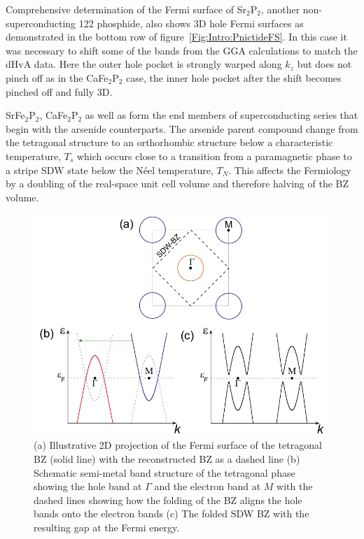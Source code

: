 Comprehensive determination of the Fermi surface of Sr$_2$P$_2$, another non-superconducting 122 phosphide, also shows 3D hole Fermi surfaces as demonstrated in the bottom row of figure~\ref{Fig:Intro:PnictideFS}. In this case it was necessary to shift some of the bands from the \ac{GGA} calculations to match the \ac{dHvA} data. Here the outer hole pocket is strongly warped along $k_z$ but does not pinch off as in the CaFe$_2$P$_2$ case, the inner hole pocket after the shift becomes pinched off and fully 3D.

SrFe$_2$P$_2$, CaFe$_2$P$_2$ as well as \BaFeP form the end members of superconducting series that begin with the arsenide counterparts. The arsenide parent compound change from the tetragonal structure to an orthorhombic structure below a characteristic temperature, $T_s$ which occurs close to a transition from a paramagnetic phase to a stripe \ac{SDW} state below the N\'eel temperature, $T_N$. This affects the Fermiology by a doubling of the real-space unit cell volume and therefore halving of the \ac{BZ} volume.
\begin{figure}[htbp]
    \begin{center}
        \includegraphics[scale=0.7]{Chapter-Introduction/Figures/AsReconstruction/AsReconstruction}
        \caption{(a) Illustrative 2D projection of the Fermi surface of the tetragonal \ac{BZ} (solid line) with the reconstructed \ac{BZ} as a dashed line (b) Schematic semi-metal band structure of the tetragonal phase showing the hole band at $\Gamma$ and the electron band at $M$ with the dashed lines showing how the folding of the \ac{BZ} aligns the hole bands onto the electron bands (c) The folded \ac{SDW} \ac{BZ} with the resulting gap at the Fermi energy.}
        \label{Fig:Intro:AsReconstruction}
    \end{center}
\end{figure}
